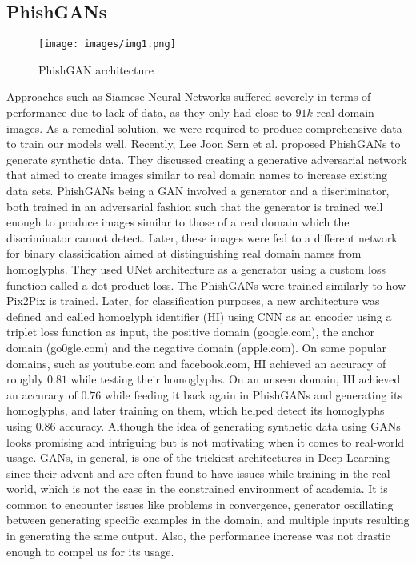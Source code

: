\documentclass[letterpaper]{article} \usepackage{aaai22}  \usepackage{times}  \usepackage{helvet}  \usepackage{courier}  \usepackage[hyphens]{url}  \usepackage{graphicx} \urlstyle{rm} \def\UrlFont{\rm}  \usepackage{natbib}  \usepackage{caption} \DeclareCaptionStyle{ruled}{labelfont=normalfont,labelsep=colon,strut=off} \frenchspacing  \setlength{\pdfpagewidth}{8.5in}  \setlength{\pdfpageheight}{11in}  \usepackage{algorithm}
\begin{document}
\subsection{PhishGANs}
\begin{figure}
    \texttt{[image: images/img1.png]}
	\caption{PhishGAN architecture\cite{sern2020phishgan}}
	\label{fig4}
\end{figure}

Approaches such as Siamese Neural Networks suffered severely in terms of performance due to lack of data, as they only had close to $91k$ real domain images. As a remedial solution, we were required to produce comprehensive data to train our models well. Recently, Lee Joon Sern et al. proposed PhishGANs to generate synthetic data\cite{sern2020phishgan}. They discussed creating a generative adversarial network\cite{goodfellow2014generative} that aimed to create images similar to real domain names to increase existing data sets. PhishGANs\cite{sern2020phishgan} being a GAN\cite{goodfellow2014generative} involved a generator and a discriminator, both trained in an adversarial fashion such that the generator is trained well enough to produce images similar to those of a real domain which the discriminator cannot detect. Later, these images were fed to a different network for binary classification aimed at distinguishing real domain names from homoglyphs. They used UNet\cite{ronneberger2015u} architecture as a generator using a custom loss function called a dot product loss. The PhishGANs\cite{sern2020phishgan} were trained similarly to how Pix2Pix\cite{isola2017image} is trained. Later, for classification purposes, a new architecture was defined and called homoglyph identifier (HI) using CNN\cite{lecun1995convolutional} as an encoder using a triplet loss function \cite{hoffer2015deep} as input, the positive domain (google.com), the anchor domain (go0gle.com) and the negative domain (apple.com). On some popular domains, such as youtube.com and facebook.com, HI achieved an accuracy of roughly $0.81$ while testing their homoglyphs. On an unseen domain, HI achieved an accuracy of $0.76$ while feeding it back again in PhishGANs\cite{sern2020phishgan} and generating its homoglyphs, and later training on them, which helped detect its homoglyphs using $0.86$ accuracy. Although the idea of generating synthetic data using GANs\cite{goodfellow2014generative} looks promising and intriguing but is not motivating when it comes to real-world usage. GANs\cite{goodfellow2014generative}, in general, is one of the trickiest architectures in Deep Learning\cite{lecun2015deep} since their advent and are often found to have issues while training in the real world, which is not the case in the constrained environment of academia. It is common to encounter issues like problems in convergence, generator oscillating between generating specific examples in the domain, and multiple inputs resulting in generating the same output. Also, the performance increase was not drastic enough to compel us for its usage. 
\end{document}
